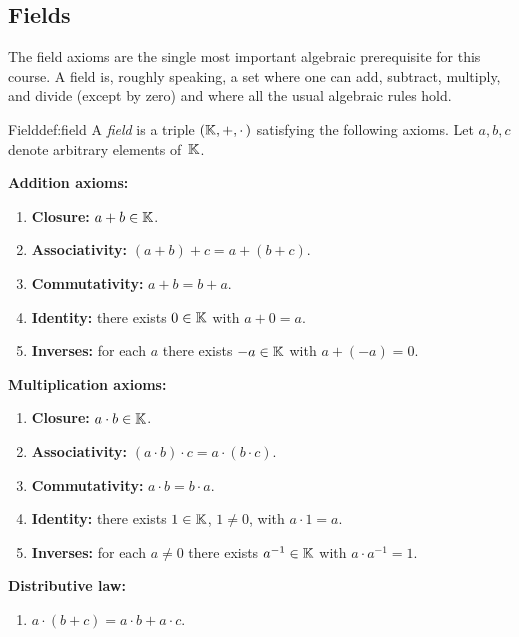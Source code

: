 \subsection{Fields}\label{subsec:fields}

The field axioms are the single most important algebraic prerequisite for
this course. A field is, roughly speaking, a set where one can add,
subtract, multiply, and divide (except by zero) and where all the usual
algebraic rules hold.

\begin{definition}{Field}{def:field}
A \emph{field} is a triple $({\mathbb{K}},+,\cdot\,)$ satisfying the
following axioms. Let $a,b,c$ denote arbitrary elements of~${\mathbb{K}}$.

\medskip
\noindent\textbf{Addition axioms:}
\begin{enumerate}[label=\textbf{A\arabic*.}]
  \item \textbf{Closure:} $a+b\in{\mathbb{K}}$.
  \item \textbf{Associativity:} $(a+b)+c = a+(b+c)$.
  \item \textbf{Commutativity:} $a+b = b+a$.
  \item \textbf{Identity:} there exists $0\in{\mathbb{K}}$ with $a+0=a$.
  \item \textbf{Inverses:} for each $a$ there exists $-a\in{\mathbb{K}}$ with
    $a+(-a)=0$.
\end{enumerate}

\medskip
\noindent\textbf{Multiplication axioms:}
\begin{enumerate}[label=\textbf{M\arabic*.}]
  \item \textbf{Closure:} $a\cdot b\in{\mathbb{K}}$.
  \item \textbf{Associativity:} $(a\cdot b)\cdot c = a\cdot(b\cdot c)$.
  \item \textbf{Commutativity:} $a\cdot b = b\cdot a$.
  \item \textbf{Identity:} there exists $1\in{\mathbb{K}}$, $1\neq 0$, with
    $a\cdot 1 = a$.
  \item \textbf{Inverses:} for each $a\neq 0$ there exists $a^{-1}\in{\mathbb{K}}$
    with $a\cdot a^{-1}=1$.
\end{enumerate}

\medskip
\noindent\textbf{Distributive law:}
\begin{enumerate}[label=\textbf{D\arabic*.}]
  \item $a\cdot(b+c)=a\cdot b + a\cdot c$.
\end{enumerate}
\end{definition}

